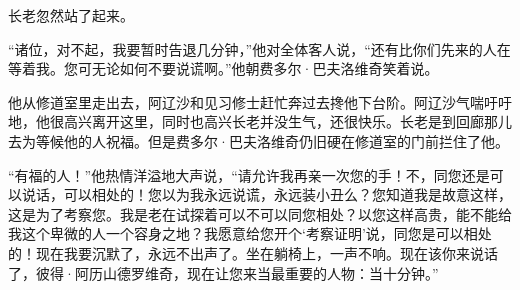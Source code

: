 \par 长老忽然站了起来。
\par “诸位，对不起，我要暂时告退几分钟，”他对全体客人说，“还有比你们先来的人在等着我。您可无论如何不要说谎啊。”他朝费多尔·巴夫洛维奇笑着说。
\par 他从修道室里走出去，阿辽沙和见习修士赶忙奔过去搀他下台阶。阿辽沙气喘吁吁地，他很高兴离开这里，同时也高兴长老并没生气，还很快乐。长老是到回廊那儿去为等候他的人祝福。但是费多尔·巴夫洛维奇仍旧硬在修道室的门前拦住了他。
\par “有福的人！”他热情洋溢地大声说，“请允许我再亲一次您的手！不，同您还是可以说话，可以相处的！您以为我永远说谎，永远装小丑么？您知道我是故意这样，这是为了考察您。我是老在试探着可以不可以同您相处？以您这样高贵，能不能给我这个卑微的人一个容身之地？我愿意给您开个‘考察证明’说，同您是可以相处的！现在我要沉默了，永远不出声了。坐在躺椅上，一声不响。现在该你来说话了，彼得·阿历山德罗维奇，现在让您来当最重要的人物：当十分钟。”
